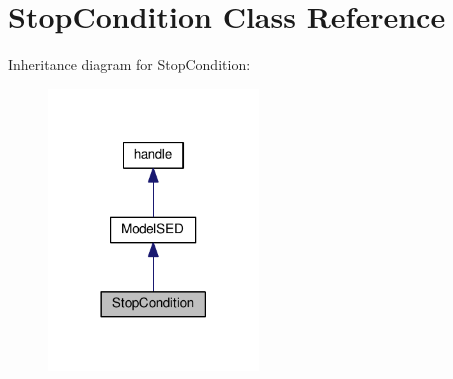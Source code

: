 \hypertarget{class_stop_condition}{}\section{Stop\+Condition Class Reference}
\label{class_stop_condition}


Inheritance diagram for Stop\+Condition\+:
\nopagebreak
\begin{figure}[H]
\begin{center}
\leavevmode
\includegraphics[width=158pt]{class_stop_condition__inherit__graph}
\end{center}
\end{figure}
